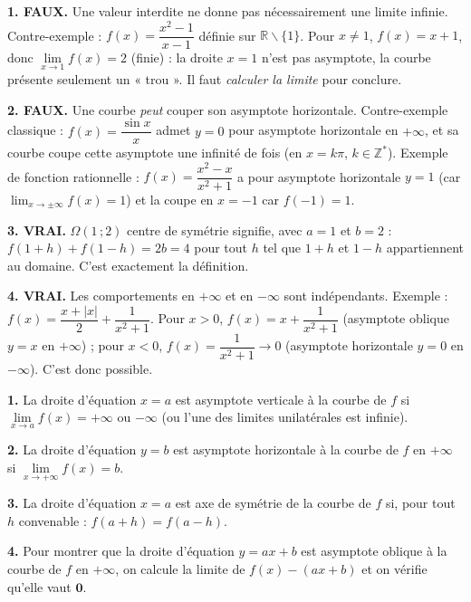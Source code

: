 \documentclass[11pt]{article}
\newcommand{\cle}[1]{{\popxbold\color{popdark}#1}}
\def\setminus{\mathbin{\backslash}}\let\smallsetminus\setminus
\begin{document}
\begin{corrige}
\textbf{1. \cle{FAUX}.} Une valeur interdite ne donne pas nécessairement une limite infinie. Contre-exemple : $f(x)=\dfrac{x^2-1}{x-1}$ définie sur $\mathbb{R}\setminus\{1\}$. Pour $x\neq 1$, $f(x)=x+1$, donc $\lim\limits_{x\to 1}f(x)=2$ (finie) : la droite $x=1$ n'est pas asymptote, la courbe présente seulement un « trou ». Il faut \emph{calculer la limite} pour conclure.

\textbf{2. \cle{FAUX}.} Une courbe \emph{peut} couper son asymptote horizontale. Contre-exemple classique : $f(x)=\dfrac{\sin x}{x}$ admet $y=0$ pour asymptote horizontale en $+\infty$, et sa courbe coupe cette asymptote une infinité de fois (en $x=k\pi$, $k\in\mathbb{Z}^*$). Exemple de fonction rationnelle : $f(x)=\dfrac{x^2-x}{x^2+1}$ a pour asymptote horizontale $y=1$ (car $\lim_{x\to\pm\infty}f(x)=1$) et la coupe en $x=-1$ car $f(-1)=1$.

\textbf{3. \cle{VRAI}.} $\Omega(1\,;2)$ centre de symétrie signifie, avec $a=1$ et $b=2$ : $f(1+h)+f(1-h)=2b=4$ pour tout $h$ tel que $1+h$ et $1-h$ appartiennent au domaine. C'est exactement la définition.

\textbf{4. \cle{VRAI}.} Les comportements en $+\infty$ et en $-\infty$ sont indépendants. Exemple : $f(x)=\dfrac{x+|x|}{2}+\dfrac{1}{x^2+1}$. Pour $x>0$, $f(x)=x+\dfrac{1}{x^2+1}$ (asymptote oblique $y=x$ en $+\infty$) ; pour $x<0$, $f(x)=\dfrac{1}{x^2+1}\to 0$ (asymptote horizontale $y=0$ en $-\infty$). C'est donc possible.
\end{corrige}

\begin{corrige}
\textbf{1.} La droite d'équation $x=a$ est \cle{asymptote verticale} à la courbe de $f$ si $\lim\limits_{x\to a}f(x)=+\infty$ ou $-\infty$ (ou l'une des limites unilatérales est infinie).

\textbf{2.} La droite d'équation $y=b$ est \cle{asymptote horizontale} à la courbe de $f$ en $+\infty$ si $\lim\limits_{x\to+\infty}f(x)=b$.

\textbf{3.} La droite d'équation $x=a$ est \cle{axe de symétrie} de la courbe de $f$ si, pour tout $h$ convenable : $f(a+h)=f(a-h)$.

\textbf{4.} Pour montrer que la droite d'équation $y=ax+b$ est \cle{asymptote oblique} à la courbe de $f$ en $+\infty$, on calcule la limite de $f(x)-(ax+b)$ et on vérifie qu'elle vaut $\mathbf{0}$.
\end{corrige}
\end{document}
